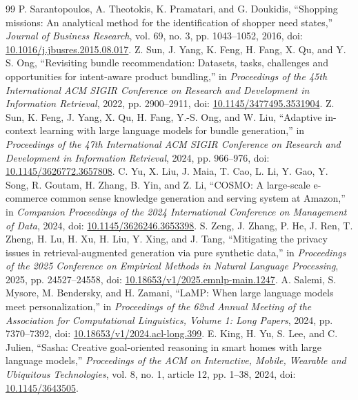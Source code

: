 \documentclass[conference]{IEEEtran}
\begin{document}
\balance
\begin{thebibliography}{99}
\scriptsize
{}P. Sarantopoulos, A. Theotokis, K. Pramatari, and G. Doukidis, ``Shopping missions: An analytical method for the identification of shopper need states,'' \emph{Journal of Business Research}, vol. 69, no. 3, pp. 1043--1052, 2016, doi: \href{https://doi.org/10.1016/j.jbusres.2015.08.017}{10.1016/j.jbusres.2015.08.017}.
Z. Sun, J. Yang, K. Feng, H. Fang, X. Qu, and Y. S. Ong, ``Revisiting bundle recommendation: Datasets, tasks, challenges and opportunities for intent-aware product bundling,'' in \emph{Proceedings of the 45th International ACM SIGIR Conference on Research and Development in Information Retrieval}, 2022, pp. 2900--2911, doi: \href{https://doi.org/10.1145/3477495.3531904}{10.1145/3477495.3531904}.
Z. Sun, K. Feng, J. Yang, X. Qu, H. Fang, Y.-S. Ong, and W. Liu, ``Adaptive in-context learning with large language models for bundle generation,'' in \emph{Proceedings of the 47th International ACM SIGIR Conference on Research and Development in Information Retrieval}, 2024, pp. 966--976, doi: \href{https://doi.org/10.1145/3626772.3657808}{10.1145/3626772.3657808}.
C. Yu, X. Liu, J. Maia, T. Cao, L. Li, Y. Gao, Y. Song, R. Goutam, H. Zhang, B. Yin, and Z. Li, ``COSMO: A large-scale e-commerce common sense knowledge generation and serving system at Amazon,'' in \emph{Companion Proceedings of the 2024 International Conference on Management of Data}, 2024, doi: \href{https://doi.org/10.1145/3626246.3653398}{10.1145/3626246.3653398}.
S. Zeng, J. Zhang, P. He, J. Ren, T. Zheng, H. Lu, H. Xu, H. Liu, Y. Xing, and J. Tang, ``Mitigating the privacy issues in retrieval-augmented generation via pure synthetic data,'' in \emph{Proceedings of the 2025 Conference on Empirical Methods in Natural Language Processing}, 2025, pp. 24527--24558, doi: \href{https://doi.org/10.18653/v1/2025.emnlp-main.1247}{10.18653/v1/2025.emnlp-main.1247}.
A. Salemi, S. Mysore, M. Bendersky, and H. Zamani, ``LaMP: When large language models meet personalization,'' in \emph{Proceedings of the 62nd Annual Meeting of the Association for Computational Linguistics, Volume 1: Long Papers}, 2024, pp. 7370--7392, doi: \href{https://doi.org/10.18653/v1/2024.acl-long.399}{10.18653/v1/2024.acl-long.399}.
E. King, H. Yu, S. Lee, and C. Julien, ``Sasha: Creative goal-oriented reasoning in smart homes with large language models,'' \emph{Proceedings of the ACM on Interactive, Mobile, Wearable and Ubiquitous Technologies}, vol. 8, no. 1, article 12, pp. 1--38, 2024, doi: \href{https://doi.org/10.1145/3643505}{10.1145/3643505}.

\end{thebibliography}
\end{document}

